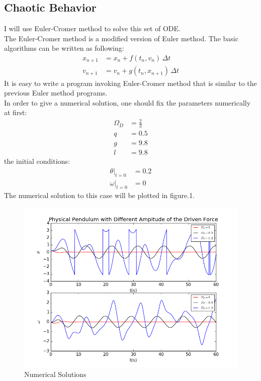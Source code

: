 \documentclass[10pt,a4paper]{article}
\begin{document}
    \subsection{Chaotic Behavior}
    I will use Euler-Cromer method to solve this set of ODE.\\
    The Euler-Cromer method is a modified version of Euler method. The basic algorithms can be written as following:
    \begin{align}
    x_{n+1} &= x_n + f(t_n, v_n) \, \Delta t\\
    v_{n+1} &= v_n + g(t_n, x_{n+1}) \, \Delta t
    \end{align}
    It is easy to write a program invoking Euler-Cromer method that is similar to the previous Euler method programs.\\
    In order to give a numerical solution, one should fix the parameters numerically at first:
    \begin{align}
    \Omega_D&=\frac{2}{3}\\
    q&=0.5\\
    g&=9.8\\
    l&=9.8
    \end{align}
    the initial conditions:
    \begin{align}
    \theta|_{t=0}&=0.2\\
    \omega|_{t=0}&=0
    \end{align}     
    The numerical solution to this case will be plotted in figure.1.
    \begin{figure}[htbp]
    	\centering
    	\includegraphics[width=5in]{chaotic_pend2.png}
    	\caption{Numerical Solutions}
    \end{figure}
\end{document}
